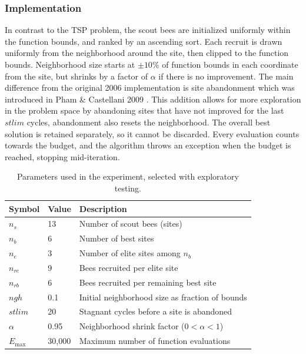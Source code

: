 \subsubsection{Implementation}
In contrast to the TSP problem, the scout bees are initialized uniformly within the function bounds, and ranked by an ascending sort.
Each recruit is drawn uniformly from the neighborhood around the site, then clipped to the function bounds.
Neighborhood size starts at $\pm10\%$ of function bounds in each coordinate from the site, but shrinks by a factor of $\alpha$ if there is no improvement.
The main difference from the original 2006 implementation \cite{Pham2006} is site abandonment which was introduced in Pham \& Castellani 2009 \cite{Pham2009}.
This addition allows for more exploration in the problem space by abandoning sites that have not improved for the last $stlim$ cycles, abandonment also resets the neighborhood. The overall best solution is retained separately, so it cannot be discarded.
Every evaluation counts towards the budget, and the algorithm throws an exception when the budget is reached, stopping mid-iteration.

\begin{table}[H]
\centering
\caption{Parameters used in the experiment, selected with exploratory testing.}
\label{tab:bees-params}
\begin{tabular}{lll}
\hline
\textbf{Symbol} & \textbf{Value} & \textbf{Description} \\
\hline
$n_s$        & 13     & Number of scout bees (sites) \\
$n_b$        & 6      & Number of best sites  \\
$n_e$        & 3      & Number of elite sites among $n_b$ \\
$n_{re}$     & 9      & Bees recruited per elite site \\
$n_{rb}$     & 6      & Bees recruited per remaining best site \\
$ngh$        & 0.1    & Initial neighborhood size as fraction of bounds \\
$stlim$      & 20     & Stagnant cycles before a site is abandoned \\
$\alpha$     & 0.95   & Neighborhood shrink factor ($0 < \alpha < 1$) \\
$E_{\max}$   & 30,000 & Maximum number of function evaluations \\
\hline
\end{tabular}
\end{table}

